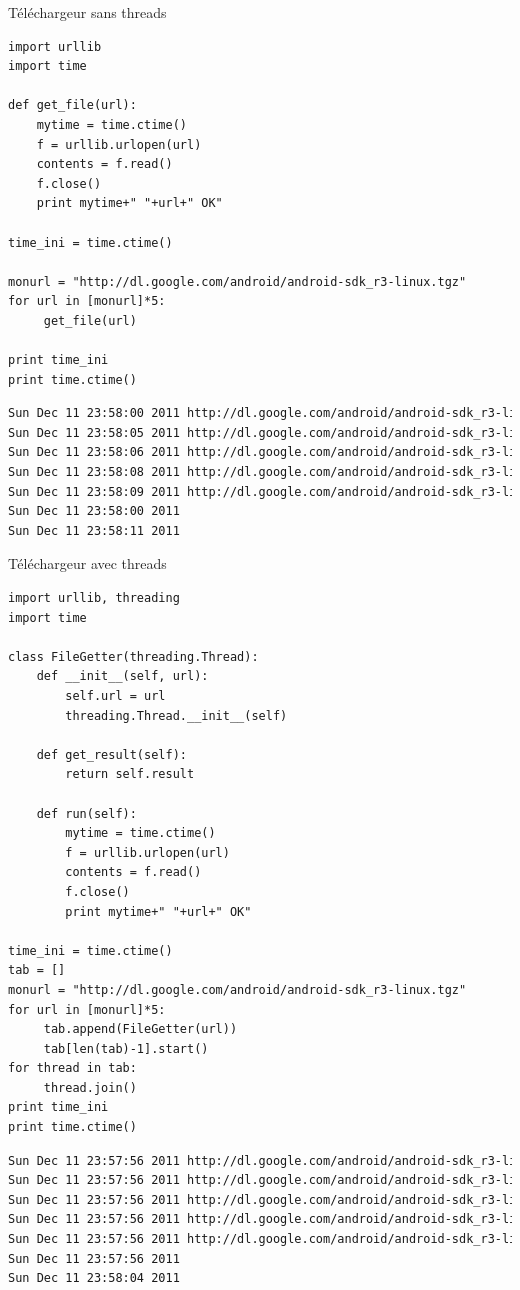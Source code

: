 \documentclass{beamer}
\begin{document}
\begin{frame}[fragile]{Téléchargeur sans threads}
\begin{lstlisting}[basicstyle=\tiny, multicols=2]
import urllib
import time

def get_file(url):
    mytime = time.ctime()
    f = urllib.urlopen(url)
    contents = f.read()
    f.close()
    print mytime+" "+url+" OK"

time_ini = time.ctime()

monurl = "http://dl.google.com/android/android-sdk_r3-linux.tgz"
for url in [monurl]*5:
     get_file(url)

print time_ini
print time.ctime()
\end{lstlisting}
\vspace{-8px}
\begin{lstlisting}[language=bash, basicstyle=\tiny]
Sun Dec 11 23:58:00 2011 http://dl.google.com/android/android-sdk_r3-linux.tgz OK
Sun Dec 11 23:58:05 2011 http://dl.google.com/android/android-sdk_r3-linux.tgz OK
Sun Dec 11 23:58:06 2011 http://dl.google.com/android/android-sdk_r3-linux.tgz OK
Sun Dec 11 23:58:08 2011 http://dl.google.com/android/android-sdk_r3-linux.tgz OK
Sun Dec 11 23:58:09 2011 http://dl.google.com/android/android-sdk_r3-linux.tgz OK
Sun Dec 11 23:58:00 2011
Sun Dec 11 23:58:11 2011
\end{lstlisting}
\end{frame}

\begin{frame}[fragile]{Téléchargeur avec threads}
\begin{lstlisting}[basicstyle=\tiny, multicols=2]
import urllib, threading
import time

class FileGetter(threading.Thread):
    def __init__(self, url):
        self.url = url
        threading.Thread.__init__(self)

    def get_result(self):
        return self.result

    def run(self):
        mytime = time.ctime()
        f = urllib.urlopen(url)
        contents = f.read()
        f.close()
        print mytime+" "+url+" OK"

time_ini = time.ctime()
tab = []
monurl = "http://dl.google.com/android/android-sdk_r3-linux.tgz"
for url in [monurl]*5:
     tab.append(FileGetter(url))
     tab[len(tab)-1].start()
for thread in tab:
     thread.join()
print time_ini
print time.ctime()
\end{lstlisting}
\begin{lstlisting}[language=bash, basicstyle=\tiny]
Sun Dec 11 23:57:56 2011 http://dl.google.com/android/android-sdk_r3-linux.tgz OK
Sun Dec 11 23:57:56 2011 http://dl.google.com/android/android-sdk_r3-linux.tgz OK
Sun Dec 11 23:57:56 2011 http://dl.google.com/android/android-sdk_r3-linux.tgz OK
Sun Dec 11 23:57:56 2011 http://dl.google.com/android/android-sdk_r3-linux.tgz OK
Sun Dec 11 23:57:56 2011 http://dl.google.com/android/android-sdk_r3-linux.tgz OK
Sun Dec 11 23:57:56 2011
Sun Dec 11 23:58:04 2011
\end{lstlisting}
\end{frame}
\end{document}
